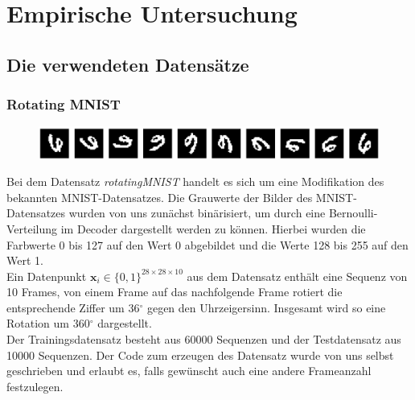 \documentclass[12pt]{article}
\newcommand{\x}{\mathbf{x}_i}
\begin{document}
	\newpage
	\section[Empirische Untersuchung]{Empirische Untersuchung}
	\subsection[Datensätze]{Die verwendeten Datensätze}
	\subsubsection{Rotating MNIST}
	\begin{figure}[!htbp]
		\centering
		\includegraphics[scale=0.4]{rotatingMNIST}
	\end{figure}
	Bei dem Datensatz \emph{rotatingMNIST} handelt es sich um eine Modifikation des bekannten MNIST-Datensatzes. Die Grauwerte der Bilder
	des MNIST-Datensatzes wurden von uns zunächst binärisiert, um durch eine Bernoulli-Verteilung im Decoder dargestellt werden zu können.
	Hierbei wurden die Farbwerte 0 bis 127 auf den Wert 0 abgebildet und die Werte 128 bis 255 auf den Wert 1. \\
	Ein Datenpunkt $\x\in \{0,1\}^{28\times 28\times 10}$ aus dem Datensatz enthält eine Sequenz von 10 Frames, von einem Frame auf das nachfolgende Frame rotiert die entsprechende Ziffer um 36$^\circ$ gegen den Uhrzeigersinn. Insgesamt wird so eine Rotation um 360$^\circ$ dargestellt. \\
	Der Trainingsdatensatz besteht aus 60000 Sequenzen und der Testdatensatz aus 10000 Sequenzen. Der Code zum erzeugen des Datensatz wurde von uns selbst geschrieben und erlaubt es, falls gewünscht auch eine andere Frameanzahl festzulegen.
\end{document}
